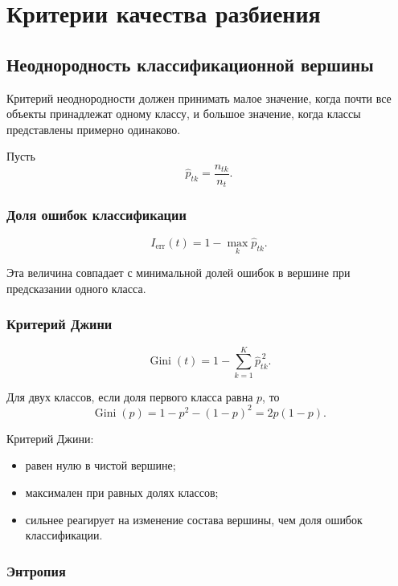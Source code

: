 \documentclass[12pt,a4paper]{article}
\theoremstyle{plain}
\theoremstyle{definition}
\theoremstyle{remark}
\newcommand{\Gini}{\operatorname{Gini}}
\begin{document}
\section{Критерии качества разбиения}

\subsection{Неоднородность классификационной вершины}

Критерий неоднородности должен принимать малое значение, когда почти все
объекты принадлежат одному классу, и большое значение, когда классы
представлены примерно одинаково.

Пусть
\[
    \widehat{p}_{tk}
    =
    \frac{n_{tk}}{n_t}.
\]

\subsubsection{Доля ошибок классификации}

\[
    I_{\mathrm{err}}(t)
    =
    1-\max_k\widehat{p}_{tk}.
\]

Эта величина совпадает с минимальной долей ошибок в вершине при
предсказании одного класса.

\subsubsection{Критерий Джини}

\[
    \Gini(t)
    =
    1-\sum_{k=1}^{K}\widehat{p}_{tk}^{\,2}.
\]

Для двух классов, если доля первого класса равна $p$, то
\[
    \Gini(p)
    =
    1-p^2-(1-p)^2
    =
    2p(1-p).
\]

Критерий Джини:
\begin{itemize}
    \item равен нулю в чистой вершине;
    \item максимален при равных долях классов;
    \item сильнее реагирует на изменение состава вершины, чем доля
    ошибок классификации.
\end{itemize}

\subsubsection{Энтропия}
\end{document}
